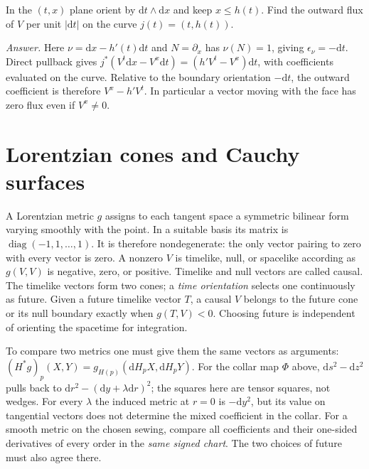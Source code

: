 \begin{exercise}
In the $(t,x)$ plane orient by $\mathrm{d}t\wedge\mathrm{d}x$ and keep $x\leq h(t)$. Find the outward flux of $V$ per unit $|\mathrm{d}t|$ on the curve $j(t)=(t,h(t))$.

\emph{Answer.} Here $\nu=\mathrm{d}x-h'(t)\mathrm{d}t$ and $N=\partial_x$ has $\nu(N)=1$, giving $\epsilon_\nu=-\mathrm{d}t$. Direct pullback gives $j^*(V^t\mathrm{d}x-V^x\mathrm{d}t)=(h'V^t-V^x)\mathrm{d}t$, with coefficients evaluated on the curve. Relative to the boundary orientation $-\mathrm{d}t$, the outward coefficient is therefore $V^x-h'V^t$. In particular a vector moving with the face has zero flux even if $V^x\ne0$.
\end{exercise}

\section{Lorentzian cones and Cauchy surfaces}\label{D-causal-geometry}

A Lorentzian metric $g$ assigns to each tangent space a symmetric bilinear form varying smoothly with the point. In a suitable basis its matrix is $\operatorname{diag}(-1,1,\ldots,1)$. It is therefore nondegenerate: the only vector pairing to zero with every vector is zero. A nonzero $V$ is timelike, null, or spacelike according as $g(V,V)$ is negative, zero, or positive. Timelike and null vectors are called causal. The timelike vectors form two cones; a \emph{time orientation} selects one continuously as future. Given a future timelike vector $T$, a causal $V$ belongs to the future cone or its null boundary exactly when $g(T,V)<0$. Choosing future is independent of orienting the spacetime for integration.

To compare two metrics one must give them the same vectors as arguments: ${(H^*g)}_p(X,Y)=g_{H(p)}(\mathrm{d}H_p X,\mathrm{d}H_p Y)$. For the collar map $\Phi$ above, $\mathrm{d}s^2-\mathrm{d}z^2$ pulls back to $\mathrm{d}r^2-{(\mathrm{d}y+\lambda\mathrm{d}r)}^2$; the squares here are tensor squares, not wedges. For every $\lambda$ the induced metric at $r=0$ is $-\mathrm{d}y^2$, but its value on tangential vectors does not determine the mixed coefficient in the collar. For a smooth metric on the chosen sewing, compare all coefficients and their one-sided derivatives of every order in the \emph{same signed chart}. The two choices of future must also agree there.

